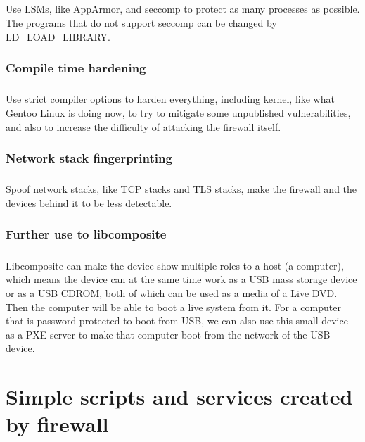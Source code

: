 \documentclass[mscthesis]{usiinfthesis}
\begin{document}
\paragraph{}
Use LSMs, like AppArmor, and seccomp to protect as many processes as possible. The programs that do not support seccomp can be changed by LD\_LOAD\_LIBRARY.

\subsection{Compile time hardening}
\paragraph{}
Use strict compiler options to harden everything, including kernel, like what Gentoo Linux is doing now, to try to mitigate some unpublished vulnerabilities, and also to increase the difficulty of attacking the firewall itself.

\subsection{Network stack fingerprinting}
\paragraph{}
Spoof network stacks, like TCP stacks and TLS stacks, make the firewall and the devices behind it to be less detectable.

\subsection{Further use to libcomposite}
\paragraph{}
Libcomposite can make the device show multiple roles to a host (a computer), which means the device can at the same time work as a USB mass storage device or as a USB CDROM, both of which can be used as a media of a Live DVD. Then the computer will be able to boot a live system from it. For a computer that is password protected to boot from USB, we can also use this small device as a PXE server to make that computer boot from the network of the USB device.

\appendix

\chapter{Simple scripts and services created by firewall}
\end{document}
